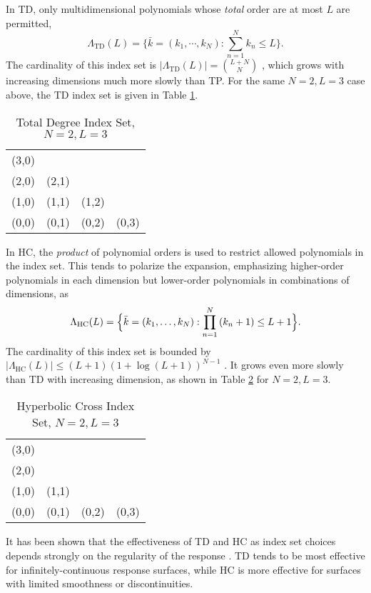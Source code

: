 In TD, only multidimensional polynomials whose \emph{total} order are at most $L$ are permitted,
\begin{equation}
  \Lambda_\text{TD}(L)=\Big\{\bar k=(k_1,\cdots,k_N):\sum_{n=1}^N k_n \leq L \Big\}.
\end{equation}
The cardinality of this index set is $|\Lambda_\text{TD}(L)|={L+N\choose N}$ \cite{hctd}, which grows with increasing
dimensions much more slowly than TP.  For the same $N=2,L=3$ case above, the TD index set is given in Table
\ref{tab:TD}. 

\begin{table}[h]
  \centering
  \begin{tabular}{c c c c}
    (3,0) &       &       &       \\
    (2,0) & (2,1) &       &       \\
    (1,0) & (1,1) & (1,2) &       \\
    (0,0) & (0,1) & (0,2) & (0,3)
  \end{tabular}
  \caption{Total Degree Index Set, $N=2,L=3$}
  \label{tab:TD}
\end{table}

In HC, the \emph{product} of polynomial orders is used to restrict allowed polynomials in the index set.  This
tends to polarize the expansion, emphasizing higher-order polynomials in each dimension but lower-order
polynomials in combinations of dimensions, as
\begin{equation}
  \Lambda_\text{HC}(L)=\Big\{\bar k=(k_1,\ldots,k_N):\prod_{n=1}^N\qty(k_n+1) \leq L+1 \Big\}.
\end{equation}
The cardinality of this index set is bounded by $|\Lambda_\text{HC}(L)|\leq (L+1)(1+\log(L+1))^{N-1}$
\cite{hctd}. It
grows even more slowly than TD with increasing dimension, as shown in Table \ref{tab:HC} for $N=2,L=3$.

\begin{table}[h]
  \centering
  \begin{tabular}{c c c c}
    (3,0) &       &       &       \\
    (2,0) &       &       &       \\
    (1,0) & (1,1) &       &       \\
    (0,0) & (0,1) & (0,2) & (0,3)
  \end{tabular}
  \caption{Hyperbolic Cross Index Set, $N=2,L=3$}
  \label{tab:HC}
\end{table}

It has been shown that the effectiveness of TD and HC as index set choices depends strongly on the regularity
of the response \cite{hctd}.  TD tends to be most effective for infinitely-continuous response surfaces,
while HC is more effective for surfaces with limited smoothness or discontinuities.

